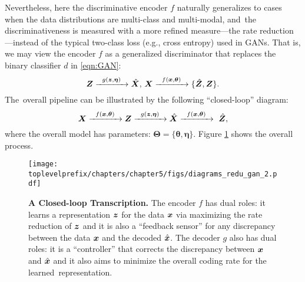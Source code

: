 \documentclass[\toplevelprefix/book-main.tex]{subfiles}
\begin{document}
{Nevertheless, here the  discriminative encoder $f$ naturally generalizes to cases when the data distributions are multi-class and multi-modal, and~the discriminativeness is measured with a more refined measure---the rate reduction---instead of the typical two-class loss (e.g., cross entropy) used in GANs. That is, we may view the encoder $f$ as a generalized discriminator that replaces the binary classifier $d$ in \eqref{eqn:GAN}:
\begin{equation}
 \bm{Z} \xrightarrow{\hspace{2mm} g(\bm{z},\bm \eta) \hspace{2mm}} \hat {\bm{X}}, \, \bm{X} \xrightarrow{\hspace{2mm} f(\bm{x}, \bm \theta)\hspace{2mm}} \{\hat {\bm{Z}}, \bm{Z}\}.
 \label{eqn:closed-loop-GAN}
\end{equation}
The~overall pipeline can be illustrated by the following ``closed-loop''  diagram:}
\begin{equation}
    \bm{X} \xrightarrow{\hspace{2mm} f(\bm{x}, \bm \theta)\hspace{2mm}} \bm{Z} \xrightarrow{\hspace{2mm} g(\bm{z},\bm \eta) \hspace{2mm}} \hat {\bm{X}} \xrightarrow{\hspace{2mm} f(\bm{x}, \bm \theta)\hspace{2mm}} \ \hat {\bm{Z}}, 
\end{equation}
where the overall model has parameters: $\bm \Theta = \{\bm \theta, \bm \eta\}$. Figure \ref{fig:auto-encoding-closed} shows the overall process.  

\begin{figure}[t]
{\texttt{[image: \\toplevelprefix/chapters/chapter5/figs/diagrams\_redu\_gan\_2.pdf]}}
\caption{{\bf %
 A Closed-loop Transcription.} The encoder $f$ has dual roles: it learns a representation $\bm{z}$ for the data $\bm{x}$ via maximizing the rate reduction of $\bm{z}$ and it is also a ``feedback sensor'' for any discrepancy between the data $\bm{x}$ and the decoded $\hat {\bm{x}}$. The decoder $g$ also has dual roles: it is a ``controller'' that corrects the  discrepancy between $\bm{x}$ and $\hat {\bm{x}}$ and it also aims to minimize the overall coding rate for the learned~representation.} \label{fig:auto-encoding-closed} 
\end{figure}
\end{document}
